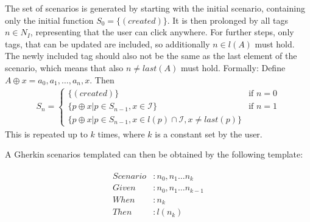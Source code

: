 The set of scenarios is generated by starting with the initial scenario, containing only the initial function $S_0 = \{(created)\}$. It is then prolonged by all tags $n \in N_I$, representing that the user can click anywhere. For further steps, only tags, that can be updated are included, so additionally $n \in l(A)$ must hold. The newly included tag should also not be the same as the last element of the scenario, which means that also $n \neq last(A)$ must hold.
Formally:
Define $A \oplus x = a_0,a_1,\ldots,a_n,x$. Then
\begin{align}
    S_n = \begin{cases} 
        \{(created)\} &\mbox{if } n = 0 \\
        \{ p \oplus x |p \in S_{n-1}, x \in \mathcal{I}\} &\mbox{if } n = 1 \\
        \{ p \oplus x |p \in S_{n-1}, x \in l(p) \cap \mathcal{I}, x \neq last(p) \} 
    \end{cases}
\end{align}
This is repeated up to $k$ times, where $k$ is a constant set by the user. 

A Gherkin scenarios templated can then be obtained by the following template:

\begin{align*}
    \label{math:modifiedkneserneyoptimaldiscounts}
    \begin{split}
    Scenario &: n_0,n_1 \ldots n_k \\
    Given &: n_0, n_1 \ldots n_{k-1} \\ 
    When &: n_k \\
    Then &: l(n_k) 
    \end{split}
    \end{align*}


